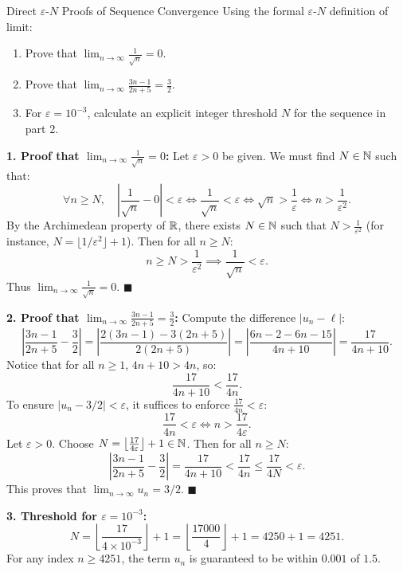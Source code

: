 \vspace{10pt}

\begin{exercise}{Direct $\varepsilon$-$N$ Proofs of Sequence Convergence}
Using the formal $\varepsilon$-$N$ definition of limit:
\begin{enumerate}[leftmargin=1.5em,itemsep=2pt]
  \item Prove that $\lim_{n \to \infty} \frac{1}{\sqrt{n}} = 0$.
  \item Prove that $\lim_{n \to \infty} \frac{3n - 1}{2n + 5} = \frac{3}{2}$.
  \item For $\varepsilon = 10^{-3}$, calculate an explicit integer threshold $N$ for the sequence in part 2.
\end{enumerate}
\end{exercise}

\begin{tabletworkspace}[5.0cm]
\end{tabletworkspace}

\begin{solution}
\textbf{1. Proof that $\lim_{n \to \infty} \frac{1}{\sqrt{n}} = 0$:}
Let $\varepsilon > 0$ be given. We must find $N \in \mathbb{N}$ such that:
\[
\forall n \ge N, \quad \left| \frac{1}{\sqrt{n}} - 0 \right| < \varepsilon \iff \frac{1}{\sqrt{n}} < \varepsilon \iff \sqrt{n} > \frac{1}{\varepsilon} \iff n > \frac{1}{\varepsilon^2}.
\]
By the Archimedean property of $\mathbb{R}$, there exists $N \in \mathbb{N}$ such that $N > \frac{1}{\varepsilon^2}$ (for instance, $N = \lfloor 1/\varepsilon^2 \rfloor + 1$).
Then for all $n \ge N$:
\[
n \ge N > \frac{1}{\varepsilon^2} \implies \frac{1}{\sqrt{n}} < \varepsilon.
\]
Thus $\lim_{n \to \infty} \frac{1}{\sqrt{n}} = 0$. \hfill $\blacksquare$

\textbf{2. Proof that $\lim_{n \to \infty} \frac{3n - 1}{2n + 5} = \frac{3}{2}$:}
Compute the difference $|u_n - \ell|$:
\[
\left| \frac{3n - 1}{2n + 5} - \frac{3}{2} \right| = \left| \frac{2(3n - 1) - 3(2n + 5)}{2(2n + 5)} \right| = \left| \frac{6n - 2 - 6n - 15}{4n + 10} \right| = \frac{17}{4n + 10}.
\]
Notice that for all $n \ge 1$, $4n + 10 > 4n$, so:
\[
\frac{17}{4n + 10} < \frac{17}{4n}.
\]
To ensure $|u_n - 3/2| < \varepsilon$, it suffices to enforce $\frac{17}{4n} < \varepsilon$:
\[
\frac{17}{4n} < \varepsilon \iff n > \frac{17}{4\varepsilon}.
\]
Let $\varepsilon > 0$. Choose $N = \left\lfloor \frac{17}{4\varepsilon} \right\rfloor + 1 \in \mathbb{N}$.
Then for all $n \ge N$:
\[
\left| \frac{3n - 1}{2n + 5} - \frac{3}{2} \right| = \frac{17}{4n + 10} < \frac{17}{4n} \le \frac{17}{4N} < \varepsilon.
\]
This proves that $\lim_{n \to \infty} u_n = 3/2$. \hfill $\blacksquare$

\textbf{3. Threshold for $\varepsilon = 10^{-3}$:}
\[
N = \left\lfloor \frac{17}{4 \times 10^{-3}} \right\rfloor + 1 = \left\lfloor \frac{17000}{4} \right\rfloor + 1 = 4250 + 1 = 4251.
\]
For any index $n \ge 4251$, the term $u_n$ is guaranteed to be within $0.001$ of $1.5$.
\end{solution}

